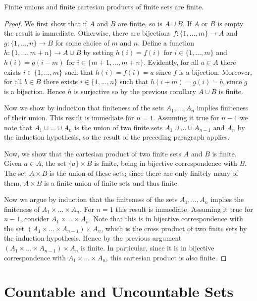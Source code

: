     \begin{corollary}
        Finite unions and finite cartesian products of finite sets are finite.
    \end{corollary}
    \begin{proof}
        We first show that if $A$ and $B$ are finite, so is $A\cup B$. If $A$ or $B$ is empty the result is immediate. Otherwise, there are bijections $f:\{1,...,m\}\rightarrow A$ and $g:\{1,...,n\}\rightarrow B$ for some choice of $m$ and $n$. Define a function $h:\{1,...,m+n\}\rightarrow A\cup B$ by setting $h(i) = f(i)$ for $i \in \{1,...,m\}$ and $h(i) = g(i-m)$ for $i \in \{m+1,...,m+n\}$. Evidently, for all $a \in A$ there exists $i \in \{1,...,m\}$ such that $h(i) = f(i) = a$ since $f$ is a bijection. Moreover, for all $b \in B$ there exists $i \in \{1,...,n\}$ such that $h(i+m) = g(i) = b$, since $g$ is a bijection. Hence $h$ is surjective so by the previous corollary $A\cup B$ is finite.

        Now we show by induction that finiteness of the sets $A_1,...,A_n$ implies finiteness of their union. This result is immediate for $n=1$. Assuming it true for $n-1$ we note that $A_1\cup...\cup A_n$ is the union of two finite sets $A_1\cup ... \cup A_{n-1}$ and $A_n$ by the induction hypothesis, so the result of the preceding paragraph applies.

        Now, we show that the cartesian product of two finite sets $A$ and $B$ is finite. Given $a \in A$, the set $\{a\}\times B$ is finite, being in bijective correspondence with $B$. The set $A \times B$ is the union of these sets; since there are only finitely many of them, $A\times B$ is a finite union of finite sets and thus finite.

        Now we argue by induction that the finiteness of the sets $A_1,...,A_n$ implies the finiteness of $A_1\times ...\times A_n$. For $n = 1$ this result is immediate. Assuming it true for $n-1$, consider $A_1\times ... \times A_n$. Note that this is in bijective correspondence with the set $(A_1\times ... \times A_{n-1})\times A_n$, which is the cross product of two finite sets by the induction hypothesis. Hence by the previous argument $(A_1\times ... \times A_{n-1})\times A_n$ is finite. In particular, since it is in bijective correspondence with $A_1\times ... \times A_n$, this cartesian product is also finite.
    \end{proof}



    \section{Countable and Uncountable Sets}

